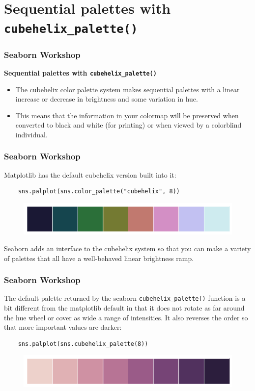 \documentclass{beamer}
\begin{document}
\section{Sequential palettes with \texttt{cubehelix\_palette()}}
\begin{frame}[fragile]
	\frametitle{Seaborn Workshop}
	\large
	\noindent \textbf{Sequential palettes with \texttt{cubehelix\_palette()}}
	\begin{itemize}
		\item The cubehelix color palette system makes sequential palettes with a linear increase or decrease in brightness and some variation in hue. 
		\item This means that the information in your colormap will be preserved when converted to black and white (for printing) or when viewed by a colorblind individual.
	\end{itemize}
	
\end{frame}
\begin{frame}[fragile]
	\frametitle{Seaborn Workshop}
	\large
	
	Matplotlib has the default cubehelix version built into it:
	\begin{verbatim}
	sns.palplot(sns.color_palette("cubehelix", 8))
	\end{verbatim}
	
	\begin{figure}
		\centering
		\includegraphics[width=0.7\linewidth]{images/color_palettes_32_0}
	\end{figure}
	Seaborn adds an interface to the cubehelix system so that you can make a variety of palettes that all have a well-behaved linear brightness ramp.
\end{frame}
\begin{frame}[fragile]
	\frametitle{Seaborn Workshop}
	\large
	The default palette returned by the seaborn \texttt{cubehelix\_palette()} function is a bit different from the matplotlib default in that it does not rotate as far around the hue wheel or cover as wide a range of intensities. It also reverses the order so that more important values are darker:
	\begin{verbatim}
	sns.palplot(sns.cubehelix_palette(8))
	\end{verbatim}
	
	\begin{figure}
		\centering
		\includegraphics[width=0.7\linewidth]{images/color_palettes_34_0}
	\end{figure}
	
\end{frame}
\end{document}
